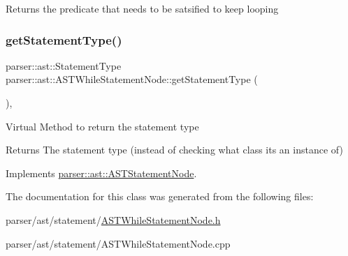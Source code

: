 \begin{DoxyReturn}{Returns}
the predicate that needs to be satsified to keep looping 
\end{DoxyReturn}
\mbox{\label{classparser_1_1ast_1_1ASTWhileStatementNode_a47ad4212e8bae1bbe602918044e39cd8}} 
\subsubsection{\texorpdfstring{get\+Statement\+Type()}{getStatementType()}}
{\footnotesize\ttfamily parser\+::ast\+::\+Statement\+Type parser\+::ast\+::\+A\+S\+T\+While\+Statement\+Node\+::get\+Statement\+Type (\begin{DoxyParamCaption}{ }\end{DoxyParamCaption})\hspace{0.3cm}{\ttfamily [override]}, {\ttfamily [virtual]}}

Virtual Method to return the statement type \begin{DoxyReturn}{Returns}
The statement type (instead of checking what class it\textquotesingle{}s an instance of) 
\end{DoxyReturn}


Implements \hyperlink{classparser_1_1ast_1_1ASTStatementNode_ac381d35d12f774a1bab0e209c5bfec1f}{parser\+::ast\+::\+A\+S\+T\+Statement\+Node}.



The documentation for this class was generated from the following files\+:\begin{DoxyCompactItemize}
\item 
parser/ast/statement/\hyperlink{ASTWhileStatementNode_8h}{A\+S\+T\+While\+Statement\+Node.\+h}\item 
parser/ast/statement/A\+S\+T\+While\+Statement\+Node.\+cpp\end{DoxyCompactItemize}

